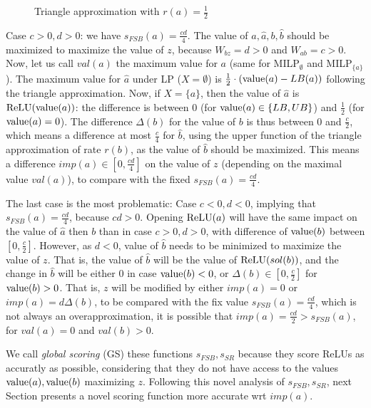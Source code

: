 {\begin{figure}[t!]
\begin{centering}
\begin{tikzpicture}[scale=1, >=stealth]
		
	\end{tikzpicture}
		\caption{Triangle approximation with $r(a)=\frac{1}{2}$
		\vspace{-0.3cm}}
	\label{triangle}
	\end{centering}
	\end{figure}





Case $c>0,d>0$: we have $s_{FSB}(a)=\frac{cd}{4}$.
The value of $a,\hat{a},b,\hat{b}$ should be maximized to maximize the value of $z$, because $W_{bz}=d>0$ and $W_{ab}=c>0$. 
Now, let us call $val(a)$ the maximum value for $a$ 
(same for MILP$_\emptyset$ and MILP$_{\{a\}}$).
The maximum value for $\hat{a}$ under LP ($X=\emptyset$) is 
$\frac{1}{2} \cdot (\val(a)-LB(a))$ following the triangle approximation. 
Now, if $X=\{a\}$, then the value of $\hat{a}$ is $\ReLU(\val(a))$: the difference is 
between 0 (for $\val(a)\in \{LB,UB\}$) and $\frac{1}{2}$ (for $\val(a)=0$). 
The difference $\Delta(b)$ for the value of $b$ is thus between 0 and $\frac{c}{2}$, which means a difference at most $\frac{c}{4}$ for $\hat{b}$, using the upper function of the triangle approximation of rate $r(b)$, as the value of $\hat{b}$ should be maximized.
This means a difference $imp(a) \in [0, \frac{cd}{4}]$ on the value of $z$ (depending on the maximal value $val(a)$), to compare with the fixed $s_{FSB}(a)=\frac{cd}{4}$.

The last case is the most problematic: 
Case $c<0,d<0$, implying that $s_{FSB}(a)=\frac{cd}{4}$, because $cd >0$.
Opening $\ReLU(a)$ will have the same impact on the value of $\hat{a}$ then $b$
than in case $c>0,d>0$, with difference of $\val(b)$ between $[0,\frac{c}{2}]$.
However, as $d<0$, value of $\hat{b}$ needs to be minimized to maximize the value of $z$. That is, the value of $\hat{b}$ will be the value of $\ReLU(sol(b))$, and the change in $\hat{b}$ will be either 0 in case $\val(b)<0$,
or $\Delta(b) \in [0,\frac{c}{2}]$ for $\val(b)>0$.
That is, $z$ will be modified by either $imp(a)=0$ or $imp(a) = d \Delta(b)$, to be compared with the fix value $s_{FSB}(a)=\frac{cd}{4}$, which is not always an overapproximation, it is possible that $imp(a)=\frac{cd}{2} > s_{FSB}(a)$, for $val(a)=0$ and $val(b)>0$.

We call {\em global scoring} (GS) these functions $s_{FSB},s_{SR}$  because they score ReLUs as accuratly as possible, considering that they do not have access to the values 
$\val(a),\val(b)$ maximizing $z$. Following this novel analysis of $s_{FSB},s_{SR}$, next Section presents a novel scoring function more accurate wrt $imp(a)$.
	

	}

